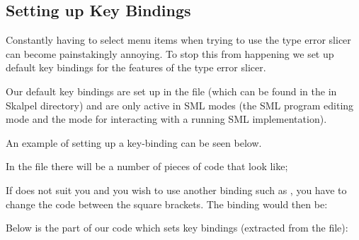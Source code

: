 \documentclass{report}
\begin{document}
\subsection{Setting up Key Bindings}
\label{sec:setting-key-bindings}

Constantly having to select menu items when trying to use the type
error slicer can become painstakingly annoying.  To stop this from
happening we set up default key bindings for the features of the type
error slicer.


Our default key bindings are set up in the file
 (which can be found in the
 in Skalpel directory) and are only
active in SML modes (the SML program editing mode and the mode for
interacting with a running SML implementation).


\medskip
An example of setting up a key-binding can be seen below.

In the file  there will be a number of
pieces of code that look like;

If  does not suit you and you wish to use another
binding such as , you have to change the
code between the square brackets.  The binding would then be:


\medskip
Below is the part of our code which sets key bindings (extracted from
the  file):
\end{document}
